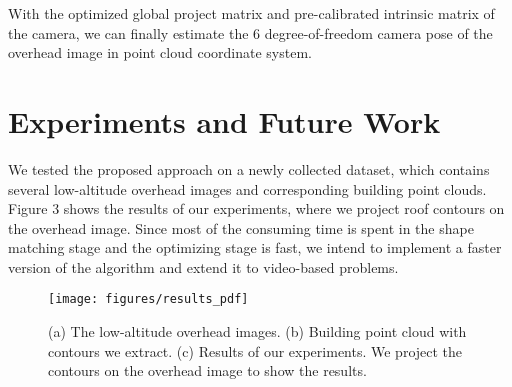 With the optimized global project matrix and pre-calibrated intrinsic matrix of the camera, we can finally estimate the 6 degree-of-freedom camera pose of the overhead image in point cloud coordinate system.
\section{Experiments and Future Work}
We tested the proposed approach on a newly collected dataset, which contains several low-altitude overhead images and corresponding building point clouds. Figure 3 shows the results of our experiments, where we project roof contours on the overhead image. 
Since most of the consuming time is spent in the shape matching stage and the optimizing stage is fast, we intend to implement a faster version of the algorithm and extend it to video-based problems. 

\begin{figure}[b]
	\centering
	\texttt{[image: figures/results\_pdf]}
	\caption{(a) The low-altitude overhead images. (b) Building point cloud with contours we extract. (c) Results of our experiments. We project the contours on the overhead image to show the results.}
	\label{fig:comparison}
\end{figure}
